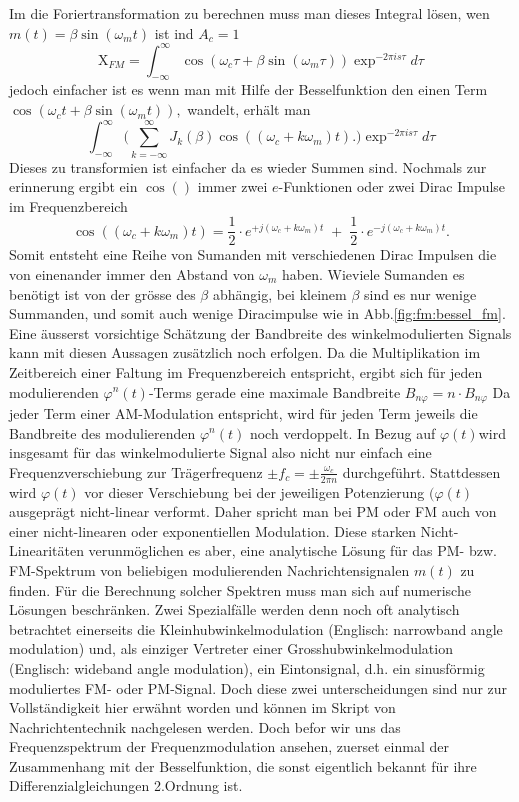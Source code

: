 Im die Foriertransformation zu berechnen muss man dieses Integral lösen, wen \( m(t) = \beta\sin(\omega_mt) \) ist ind \(A_c = 1\)
\[
    \textrm{X}_{FM} = \int^\infty_{-\infty} \cos (\omega_c \tau +\beta\sin(\omega_m\tau)) \exp^{-2\pi i s \tau}d\tau
\]
jedoch einfacher ist es wenn man mit Hilfe der Besselfunktion den einen Term \(\cos(\omega_c t+\beta\sin(\omega_mt)),\) wandelt,  erhält man
\[
    \int^\infty_{-\infty} \bigl(\sum_{k= -\infty}^\infty J_{k}(\beta) \cos((\omega_c+k\omega_m)t).\bigr) \exp^{-2\pi i s \tau}d\tau
\]
Dieses zu transformien ist einfacher da es wieder Summen sind.
Nochmals zur erinnerung ergibt ein \( \cos() \) immer zwei \(e\)-Funktionen oder zwei Dirac Impulse im Frequenzbereich
\[
    \cos((\omega_c+k\omega_m)t) = \frac{1}{2} \cdot e^{+j(\omega_c+k\omega_m)t}\;+\;\frac{1}{2} \cdot e^{-j(\omega_c+k\omega_m)t}.
\]
Somit entsteht eine Reihe von Sumanden mit verschiedenen Dirac Impulsen die von einenander immer den Abstand von \(\omega_m\) haben.
Wieviele Sumanden es benötigt ist von der grösse des \(\beta\) abhängig, bei kleinem \(\beta\) sind es nur wenige Summanden, und somit auch wenige Diracimpulse wie in Abb.\ref{fig:fm:bessel_fm}.
Eine äusserst vorsichtige Schätzung der Bandbreite des winkelmodulierten Signals kann mit diesen Aussagen zusätzlich noch erfolgen.
Da die Multiplikation im Zeitbereich einer Faltung im Frequenzbereich entspricht, ergibt sich für jeden modulierenden \(\varphi^n (t)\)-Terms gerade 
eine maximale Bandbreite \(B_{n\varphi} = n \cdot B_{n\varphi}\)
Da jeder Term einer AM-Modulation entspricht, wird für jeden Term jeweils die Bandbreite des modulierenden \(\varphi^n (t)\) noch verdoppelt.
In Bezug auf \(\varphi(t)\)wird insgesamt für das winkelmodulierte Signal also nicht nur einfach eine 
Frequenzverschiebung zur Trägerfrequenz \(\pm f_c = \pm \frac{\omega_c}{2\pi n}\) durchgeführt.
Stattdessen wird \(\varphi(t)\) vor dieser Verschiebung bei der jeweiligen Potenzierung \((\varphi(t)\) ausgeprägt nicht-linear verformt.
Daher spricht man bei PM oder FM auch von einer nicht-linearen oder exponentiellen Modulation.
Diese starken Nicht-Linearitäten verunmöglichen es aber, eine analytische Lösung für das PM- bzw. FM-Spektrum von beliebigen modulierenden Nachrichtensignalen \(m(t)\) zu finden.
Für die Berechnung solcher Spektren muss man sich auf numerische Lösungen beschränken.
Zwei Spezialfälle werden denn noch oft analytisch betrachtet einerseits die Kleinhubwinkelmodulation (Englisch: narrowband angle modulation) und, als
einziger Vertreter einer Grosshubwinkelmodulation (Englisch: wideband angle modulation), ein Eintonsignal, d.h. ein sinusförmig moduliertes FM- oder PM-Signal.
Doch diese zwei unterscheidungen sind nur zur Vollständigkeit hier erwähnt worden und können im Skript von Nachrichtentechnik \cite{fm:NAT} nachgelesen werden.
Doch befor wir uns das Frequenzspektrum der Frequenzmodulation ansehen, zuerset einmal der Zusammenhang mit der Besselfunktion, 
die sonst eigentlich bekannt für ihre Differenzialgleichungen 2.Ordnung ist.

